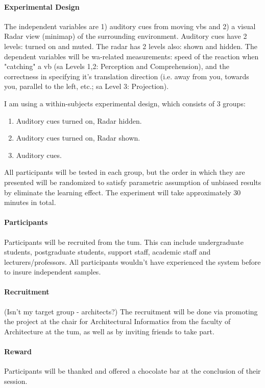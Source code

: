 \paragraph{Experimental Design}

The independent variables are 1) auditory cues from moving \gls{vb}s and 2) a visual Radar view (minimap) of the surrounding environment. Auditory cues have 2 levels: turned on and muted. The radar has 2 levels also: shown and hidden.
The dependent variables will be \gls{wa}-related measurements: speed of the reaction when "catching" a \gls{vb} (\gls{sa} Levels 1,2: Perception and Comprehension), and the correctness in specifying it's translation direction (i.e. away from you, towards you, parallel to the left, etc.; \gls{sa} Level 3: Projection).

I am using a within-subjects experimental design, which consists of 3 groups:
\begin{enumerate}
	\item Auditory cues turned on, Radar hidden.
	\item Auditory cues turned on, Radar shown.
	\item Auditory cues.
\end{enumerate}
All participants will be tested in each group, but the order in which they are presented will be randomized to satisfy parametric assumption of unbiased results by eliminate the learning effect. The experiment will take approximately 30 minutes in total.

\paragraph{Participants}
Participants will be recruited from the \gls{tum}. This can include undergraduate students, postgraduate students, support staff, academic staff and lecturers/professors. All participants wouldn't have experienced the system before to insure independent samples.

\paragraph{Recruitment}
(Isn't my target group - architects?) The recruitment will be done via promoting the project at the chair for Architectural Informatics from the faculty of Architecture at the \gls{tum}, as well as by inviting friends to take part. 

\paragraph{Reward}
Participants will be thanked and offered a chocolate bar at the conclusion of their session.

